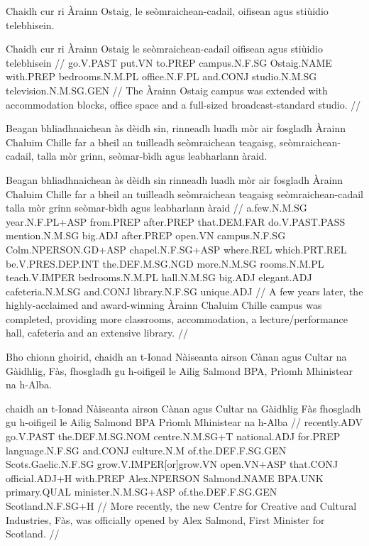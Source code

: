 \documentclass[a4paper,10pt]{article}
\begin{document}
\ex
\begingl
\glpre Chaidh cur ri Àrainn Ostaig, le seòmraichean-cadail, oifisean agus stiùidio telebhisein. 

\vspace{4mm}
\gla Chaidh cur ri Àrainn Ostaig le seòmraichean-cadail oifisean agus stiùidio telebhisein  //
\glb go.V.PAST put.VN to.PREP campus.N.F.SG Ostaig.NAME with.PREP bedrooms.N.M.PL office.N.F.PL and.CONJ studio.N.M.SG television.N.M.SG.GEN  //
\glft The Àrainn Ostaig campus was extended with accommodation blocks, office space and a full-sized broadcast-standard studio. //
\endgl
\xe

\ex
\begingl
\glpre Beagan bhliadhnaichean às dèidh sin, rinneadh luadh mòr air fosgladh Àrainn Chaluim Chille far a bheil an tuilleadh seòmraichean teagaisg, seòmraichean-cadail, talla mòr grinn, seòmar-bìdh agus leabharlann àraid. 

\vspace{4mm}
\gla Beagan bhliadhnaichean às dèidh sin rinneadh luadh mòr air fosgladh Àrainn Chaluim Chille far a bheil an tuilleadh seòmraichean teagaisg seòmraichean-cadail talla mòr grinn seòmar-bìdh agus leabharlann àraid  //
\glb a.few.N.M.SG year.N.F.PL+ASP from.PREP after.PREP that.DEM.FAR do.V.PAST.PASS mention.N.M.SG big.ADJ after.PREP open.VN campus.N.F.SG Colm.NPERSON.GD+ASP chapel.N.F.SG+ASP where.REL which.PRT.REL be.V.PRES.DEP.INT the.DEF.M.SG.NGD more.N.M.SG rooms.N.M.PL teach.V.IMPER bedrooms.N.M.PL hall.N.M.SG big.ADJ elegant.ADJ cafeteria.N.M.SG and.CONJ library.N.F.SG unique.ADJ  //
\glft A few years later, the highly-acclaimed and award-winning Àrainn Chaluim Chille campus was completed, providing more classrooms, accommodation, a lecture/performance hall, cafeteria and an extensive library. //
\endgl
\xe

\ex
\begingl
\glpre Bho chionn ghoirid, chaidh an t-Ionad Nàiseanta airson Cànan agus Cultar na Gàidhlig, Fàs, fhosgladh gu h-oifigeil le Ailig Salmond BPA, Prìomh Mhinistear na h-Alba. 

\vspace{4mm}
 chaidh an t-Ionad Nàiseanta airson Cànan agus Cultar na Gàidhlig Fàs fhosgladh gu h-oifigeil le Ailig Salmond BPA Prìomh Mhinistear na h-Alba  //
\glb recently.ADV go.V.PAST the.DEF.M.SG.NOM centre.N.M.SG+T national.ADJ for.PREP language.N.F.SG and.CONJ culture.N.M of.the.DEF.F.SG.GEN Scots.Gaelic.N.F.SG grow.V.IMPER[or]grow.VN open.VN+ASP that.CONJ official.ADJ+H with.PREP Alex.NPERSON Salmond.NAME BPA.UNK primary.QUAL minister.N.M.SG+ASP of.the.DEF.F.SG.GEN Scotland.N.F.SG+H  //
\glft More recently, the new Centre for Creative and Cultural Industries, Fàs, was officially opened by Alex Salmond, First Minister for Scotland. //
\endgl
\xe
\end{document}
